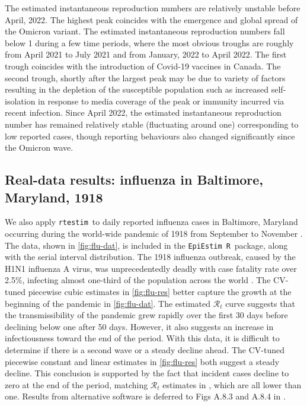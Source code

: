 \documentclass[10pt,letterpaper]{article}
\newcommand{\R}{\texttt{R}}
\def\RtEstim{\texttt{rtestim}}
\def\EpiEstim{\texttt{EpiEstim}}
\def\calR{\mathcal{R}}
\begin{document}
The estimated instantaneous reproduction numbers are relatively unstable before
April, 2022. The highest peak coincides with the emergence and global spread of
the Omicron variant. The estimated instantaneous reproduction numbers fall below
1 during a few time periods, where the most obvious troughs are roughly from
April 2021 to July 2021 and from January, 2022 to April 2022. The first trough
coincides with the introduction of Covid-19 vaccines in Canada. The second
trough, shortly after the largest peak may be due to variety of factors
resulting in the depletion of the susceptible population such as increased
self-isolation in response to media coverage of the peak or immunity incurred
via recent infection. Since April 2022, the estimated instantaneous reproduction
number has remained relatively stable (fluctuating around one) corresponding to
low reported cases, though reporting behaviours also changed significantly since
the Omicron wave. 


\subsection{Real-data results: influenza in Baltimore, Maryland, 1918}

We also apply \RtEstim\ to daily reported influenza cases in Baltimore, Maryland
occurring during the world-wide pandemic of 1918 from September to November
\cite{frost1919influenza}. The data, shown in \autoref{fig:flu-dat}, is included
in the \EpiEstim\ \R\ package, along with the serial interval distribution. The
1918 influenza outbreak, caused by the H1N1 influenza A virus, was
unprecedentedly deadly with case fatality rate over 2.5\%, infecting almost
one-third of the population across the world \cite{taubenberger20061918}. The
CV-tuned piecewise cubic estimates in \autoref{fig:flu-res} better capture the
growth at the beginning of the pandemic in \autoref{fig:flu-dat}. The estimated
$\calR_t$ curve suggests that the transmissibility of the pandemic grew rapidly
over the first 30 days before declining below one after 50 days. However, it
also suggests an increase in infectiousness toward the end of the period. With
this data, it is difficult to determine if there is a second wave or a steady
decline ahead. The CV-tuned piecewise constant and linear estimates in
\autoref{fig:flu-res} both suggest a steady decline. This conclusion is
supported by the fact that incident cases decline to zero at the end of the
period, matching $\calR_t$ estimates in \cite{cori2013new}, which are all lower
than one. Results from alternative software is deferred to Figs A.8.3 and 
A.8.4 in .
\end{document}
